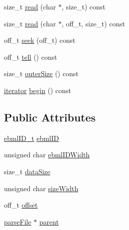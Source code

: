 \begin{DoxyCompactItemize}
\item 
size\+\_\+t \mbox{\hyperlink{classebml_1_1parseFile_a7990c780ffcea11f4091d8e72f8c82a2}{read}} (char $\ast$, size\+\_\+t) const
\item 
size\+\_\+t \mbox{\hyperlink{classebml_1_1parseFile_adf66ffa2232190fd80d571234101168d}{read}} (char $\ast$, off\+\_\+t, size\+\_\+t) const
\item 
off\+\_\+t \mbox{\hyperlink{classebml_1_1parseFile_afadebe20ce8552072386aa274063026c}{seek}} (off\+\_\+t) const
\item 
off\+\_\+t \mbox{\hyperlink{classebml_1_1parseFile_a81ef81127bb4b467e56d5866ce834acd}{tell}} () const
\item 
size\+\_\+t \mbox{\hyperlink{classebml_1_1parseFile_ac156b7959ace5c0ef511fd561dd5aa7e}{outer\+Size}} () const
\item 
\mbox{\hyperlink{classebml_1_1parseFile_1_1iterator}{iterator}} \mbox{\hyperlink{classebml_1_1parseFile_aaa18341bf2735f25e4302f38dbd51748}{begin}} () const
\end{DoxyCompactItemize}
\subsection*{Public Attributes}
\begin{DoxyCompactItemize}
\item 
\mbox{\hyperlink{namespaceebml_a86c5f604ddf12a74aa9812e997a58691}{ebml\+I\+D\+\_\+t}} \mbox{\hyperlink{classebml_1_1parseFile_ae05c961961bd5c0ab9e5d027a4152df1}{ebml\+ID}}
\item 
unsigned char \mbox{\hyperlink{classebml_1_1parseFile_a0ff076fb9e1326d33c1d548b5d64f61d}{ebml\+I\+D\+Width}}
\item 
size\+\_\+t \mbox{\hyperlink{classebml_1_1parseFile_a313a39468cbc316035721c0198168e02}{data\+Size}}
\item 
unsigned char \mbox{\hyperlink{classebml_1_1parseFile_ad13d3f7ac6cc6119754bda17260657fd}{size\+Width}}
\item 
off\+\_\+t \mbox{\hyperlink{classebml_1_1parseFile_ab24f05f852f306ce6ea5b1be02cc8476}{offset}}
\item 
\mbox{\hyperlink{classebml_1_1parseFile}{parse\+File}} $\ast$ \mbox{\hyperlink{classebml_1_1parseFile_a00df584c2edbd4ca1cd0a3e9082f9004}{parent}}
\end{DoxyCompactItemize}
